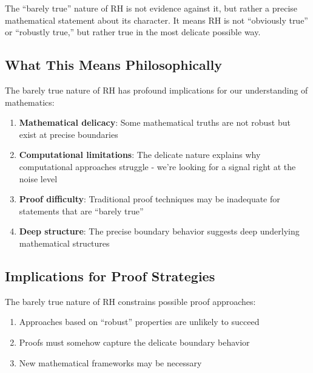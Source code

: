 \begin{remark}
The ``barely true'' nature of RH is not evidence against it, but rather a precise mathematical statement about its character. It means RH is not ``obviously true'' or ``robustly true,'' but rather true in the most delicate possible way.
\end{remark}

\subsection{What This Means Philosophically}
\label{subsec:philosophical_meaning}

The barely true nature of RH has profound implications for our understanding of mathematics:

\begin{enumerate}
\item \textbf{Mathematical delicacy}: Some mathematical truths are not robust but exist at precise boundaries

\item \textbf{Computational limitations}: The delicate nature explains why computational approaches struggle - we're looking for a signal right at the noise level

\item \textbf{Proof difficulty}: Traditional proof techniques may be inadequate for statements that are ``barely true''

\item \textbf{Deep structure}: The precise boundary behavior suggests deep underlying mathematical structures
\end{enumerate}

\subsection{Implications for Proof Strategies}
\label{subsec:proof_strategy_implications}

\begin{theorem}
The barely true nature of RH constrains possible proof approaches:
\begin{enumerate}
\item Approaches based on ``robust'' properties are unlikely to succeed
\item Proofs must somehow capture the delicate boundary behavior
\item New mathematical frameworks may be necessary
\end{enumerate}
\end{theorem}


